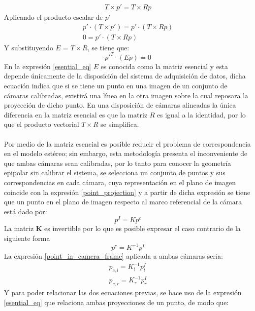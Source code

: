 \begin{align}
    T \times p' = T \times Rp
\end{align}
Aplicando el producto escalar de $p'$
\begin{align}
    p'\cdot(T \times p') = p' \cdot(T \times Rp)\\
    0 = p' \cdot(T \times Rp)
\end{align}
Y substituyendo $E$ = $T \times R$, se tiene que:
\begin{equation}
    p'^{T} \cdot(Ep) = 0 \label{esential_eq}
\end{equation}
En la expresión \eqref{esential_eq} $E$ es conocida como la matriz esencial \cite[p~257]{Hartley2004} y esta depende únicamente de la disposición del sistema de adquisición de datos, dicha ecuación indica que si se tiene un punto en una imagen de un conjunto de cámaras calibradas, existirá una línea en la otra imagen sobre la cual reposara la proyección de dicho punto. En una disposición de cámaras alineadas la única diferencia en la matriz esencial es que la matriz $R$ es igual a la identidad, por lo que el producto vectorial $T \times R$ se simplifica.
\\
\\
Por medio de la matriz esencial es posible reducir el problema de correspondencia en el modelo estéreo; sin embargo, esta metodología presenta el inconveniente de que ambas cámaras sean calibradas, por lo tanto para conocer la geometría epipolar sin calibrar el sistema, se selecciona un conjunto de puntos y sus correspondencias en cada cámara, cuya representación en el plano de imagen coincide con la expresión \eqref{point_projection} y a partir de dicha expresión se tiene que un punto en el plano de imagen respecto al marco referencial de la cámara está dado por:
\begin{equation}
    p^{I} = Kp^{c}
\end{equation}
La matriz \textbf{K} es invertible por lo que es posible expresar el caso contrario de la siguiente forma
\begin{equation}
    p^{c} = K^{-1}p^{I} \label{point_in_camera_frame}
\end{equation}
La expresión \eqref{point_in_camera_frame} aplicada a ambas cámaras sería:
\begin{align}
    p_{c,l} = K^{-1}_{l}p^{I}_{l}\\
    p_{c,r} = K^{-1}_{r}p^{I}_{r}
\end{align}
Y para poder relacionar las dos ecuaciones previas, se hace uso de la expresión \eqref{esential_eq} que relaciona ambas proyecciones de un punto, de modo que:
